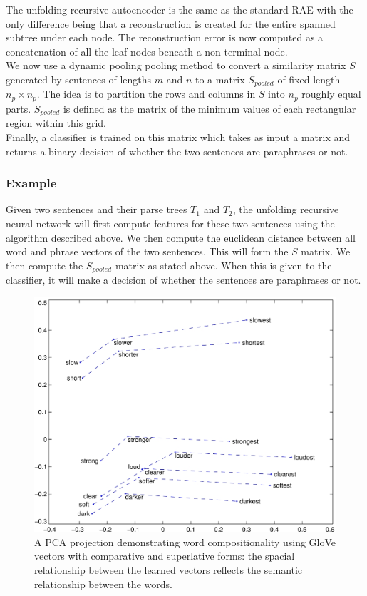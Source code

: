 \documentclass[conference]{IEEEtran}
\begin{document}
The unfolding recursive autoencoder is the same as the standard RAE with the only difference being that a reconstruction is created for the entire spanned subtree under each node. The reconstruction error is now computed as a concatenation of all the leaf nodes beneath a non-terminal node.\\

We now use a dynamic pooling pooling method to convert a similarity matrix $S$ generated by sentences of lengths $m$ and $n$ to a matrix $S_{pooled}$ of fixed length $n_p \times n_p$. The idea is to partition the rows and columns in $S$ into $n_p$ roughly equal parts. $S_{pooled}$ is defined as the matrix of the minimum values of each rectangular region within this grid.\\

Finally, a classifier is trained on this matrix which takes as input a matrix and returns a binary decision of whether the two sentences are paraphrases or not.\\

\subsubsection{Example}
Given two sentences and their parse trees $T_1$ and $T_2$, the unfolding recursive neural network will first compute features for these two sentences using the algorithm described above. We then compute the euclidean distance between all word and phrase vectors of the two sentences. This will form the $S$ matrix. We then compute the $S_{pooled}$ matrix as stated above. When this is given to the classifier, it will make a decision of whether the sentences are paraphrases or not.\\

\begin{figure}
	\centering
	\includegraphics[scale=3.5]{glove_demo.jpg}
	\caption{A PCA projection demonstrating word compositionality using GloVe vectors with comparative and superlative forms: the spacial relationship between the learned vectors reflects the semantic relationship between the words.}
	\label{feat}
\end{figure}
\end{document}
